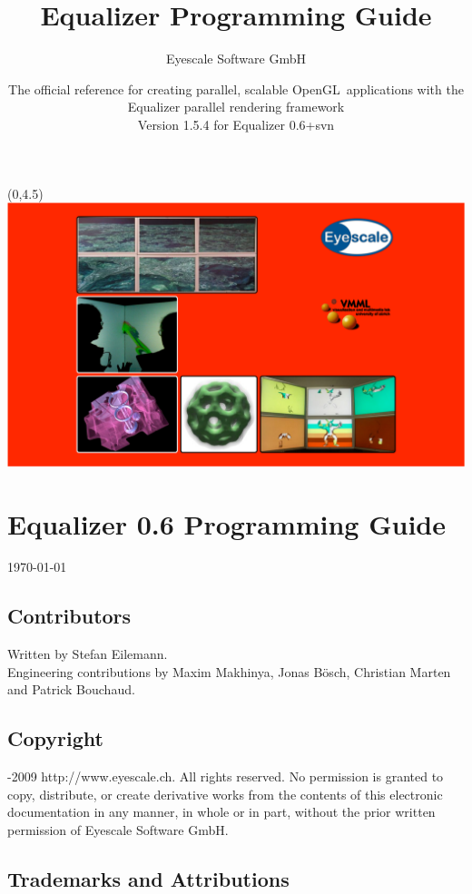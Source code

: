 \documentclass[10pt,a4]{scrartcl}
\title{Equalizer Programming Guide}
\author{Eyescale Software GmbH}
\date{
  \vspace{15cm}
  {\Large\sffamily The official reference for creating parallel,
    scalable OpenGL\texttrademark\ applications with the Equalizer
    parallel rendering framework}\\\vspace{1cm}
  Version 1.5.4 for Equalizer 0.6+svn\\[\medskipamount]
}
\begin{document}
\pagestyle{empty}
\maketitle
\thispagestyle{empty}
\begin{textblock}{}(0,4.5)
  \hspace{-1cm}\includegraphics[width=22cm]{images/teaser.pdf}
\end{textblock}

\clearpage

\lstset{language=C++}
\section*{Equalizer 0.6 Programming Guide}
\today
\subsection*{Contributors}

Written by Stefan Eilemann.\\
Engineering contributions by Maxim Makhinya, Jonas B\"osch, Christian
Marten and Patrick Bouchaud.

\subsection*{Copyright}

-2009 
{http://www.eyescale.ch}. All rights reserved. No permission is
granted to copy, distribute, or create derivative works from the
contents of this electronic documentation in any manner, in whole or in
part, without the prior written permission of Eyescale Software GmbH.

\subsection*{Trademarks and Attributions}
\end{document}
